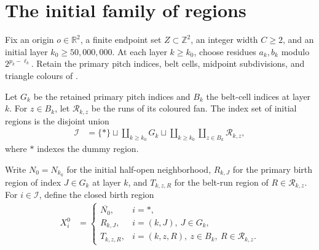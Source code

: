 \section{The initial family of regions}
\label{sec:area_law_initial_regions}

Fix an origin $o\in\mathbb R^2$, a finite endpoint set
$Z\subset\mathbb Z^2$, an integer width $C\ge 2$, and an initial layer
$k_0\ge 50{,}000{,}000$. At each layer $k\ge k_0$, choose residues
$a_k,b_k$ modulo $2^{p_k-\ell_k}$. Retain the primary pitch indices, belt
cells, midpoint subdivisions, and triangle colours of
\cite[Section~11]{OpenAI2026AreaLaw}.


\begin{definition}
    \label{def:area_law_initial_region_indices}
    \leanok
    Let $G_k$ be the retained primary pitch indices and $B_k$ the
    belt-cell indices at layer $k$. For $z\in B_k$, let $\mathcal R_{k,z}$
    be the runs of its coloured fan. The index set of initial regions is
    the disjoint union
    \begin{align}
        \mathcal I
         & =\{*\}\sqcup\coprod_{k\ge k_0}G_k
        \sqcup\coprod_{k\ge k_0}\coprod_{z\in B_k}\mathcal R_{k,z},
    \end{align}
    where $*$ indexes the dummy region.
\end{definition}

\begin{definition}
    \label{def:area_law_initial_birth_regions}
    \leanok
    Write $N_0=N_{k_0}$ for the initial half-open neighborhood,
    $R_{k,J}$ for the primary birth region of index $J\in G_k$ at layer $k$,
    and $T_{k,z,R}$ for the belt-run region of $R\in\mathcal R_{k,z}$.
    For $i\in\mathcal I$, define the closed birth region
    \begin{align}
        X_i^0 & =
        \begin{cases}
            \overline{N_0}, & i=*,                                         \\
            R_{k,J},        & i=(k,J),\ J\in G_k,                          \\
            T_{k,z,R},      & i=(k,z,R),\ z\in B_k,\ R\in\mathcal R_{k,z}.
        \end{cases}
    \end{align}
\end{definition}

